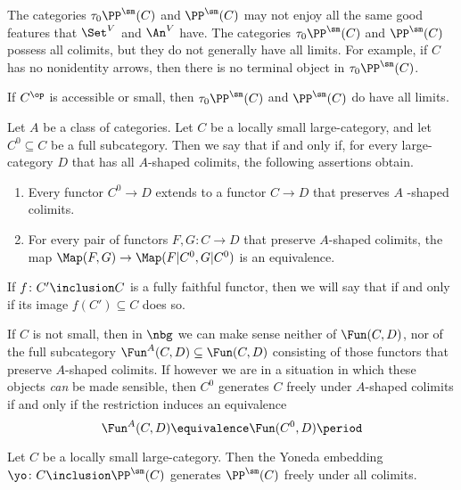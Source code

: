 \begin{nul}
	The categories $ \tau_0\PP^{\sm}(C) $ and $ \PP^{\sm}(C) $
	may not enjoy all the same good features that
	$ \Set^V $ and $ \An^V$ have.
	The categories $ \tau_0\PP^{\sm}(C) $ and $ \PP^{\sm}(C) $
	possess all colimits,
	but they do not generally have all limits.
	For example, if $C$ has no nonidentity arrows, then
	there is no terminal object in $ \tau_0\PP^{\sm}(C) $.
	
	If $ C^{\op} $ is accessible or small,
	then $ \tau_0\PP^{\sm}(C) $ and $ \PP^{\sm}(C) $ do have all limits.
\end{nul}

\begin{definition}
	Let $ A $ be a class of categories.
	Let $ C $ be a locally small large-category,
	and let $ C^0 \subseteq C $ be a full subcategory.
	Then we say that
	if and only if,
	for every large-category $ D $
	that has all $ A $-shaped colimits,
	the following assertions obtain.
	\begin{enumerate}
		\item Every functor $ C^0 \to D $ extends
			to a functor $ C \to D $
			that preserves $ A $ -shaped colimits.
		\item For every pair of functors
			$ F, G \colon C \to D $
			that preserve $ A $-shaped colimits,
			the map
			$ \Map(F, G) \to \Map(F|C^0, G|C^0 ) $
			is an equivalence.
	\end{enumerate}
	If $ f \colon C' \inclusion C $ is a fully faithful functor,
	then we will say that
	if and only if its image $ f(C') \subseteq C $ does so.
\end{definition}

\begin{remark}
	If $ C $ is not small, then in $ \nbg $
	we can make sense neither of $ \Fun(C,D) $,
	nor of the full subcategory
	$ \Fun^{A}(C, D) \subseteq \Fun(C,D) $
	consisting of those functors that preserve
	$ A $-shaped colimits.
	If however we are in a situation in which
	these objects \emph{can} be made sensible,
	then $ C^0 $ generates $ C $ freely under
	$ A $-shaped colimits
	if and only if the restriction induces an equivalence
	\[
		\Fun^A(C, D) \equivalence \Fun(C^0, D) \period
	\]
\end{remark}

\begin{proposition}%
	\label{prp:PPsmisfreelygenerated}
	Let $ C $ be a locally small large-category.
	Then the Yoneda embedding
	$ \yo \colon C \inclusion \PP^{\sm}(C) $
	generates $ \PP^{\sm}(C) $ freely under all colimits.
\end{proposition}

